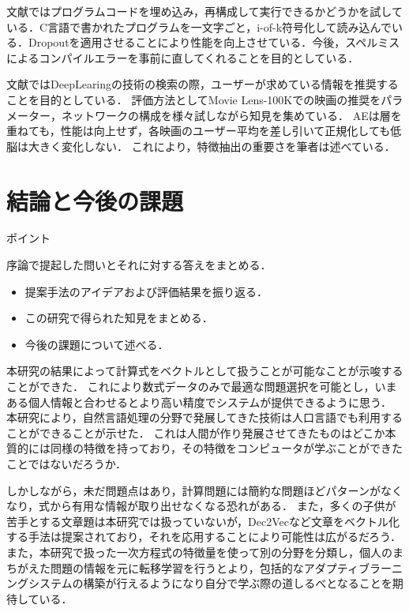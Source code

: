 \documentclass[a4j,11pt,report]{jsbook}
\newcommand{\point}[1]{
\begin{itembox}[l]{ポイント}
  #1
\end{itembox}
}
\begin{document}
文献\cite{lannrenn4}ではプログラムコードを埋め込み，再構成して実行できるかどうかを試している．C言語で書かれたプログラムを一文字ごと，i-of-k符号化して読み込んでいる．Dropoutを適用させることにより性能を向上させている．今後，スペルミスによるコンパイルエラーを事前に直してくれることを目的としている．

文献\cite{kannrenn5}ではDeepLearingの技術の検索の際，ユーザーが求めている情報を推奨することを目的としている．
評価方法としてMovie Lens-100Kでの映画の推奨をパラメーター，ネットワークの構成を様々試しながら知見を集めている．
AEは層を重ねても，性能は向上せず，各映画のユーザー平均を差し引いて正規化しても低脳は大きく変化しない．
これにより，特徴抽出の重要さを筆者は述べている．





\chapter{結論と今後の課題 \label{ch:conclusion}}
\point{
序論で提起した問いとそれに対する答えをまとめる．
\begin{itemize}
  \item 提案手法のアイデアおよび評価結果を振り返る．
  \item この研究で得られた知見をまとめる．
  \item 今後の課題について述べる．
\end{itemize}
}
\fi

本研究の結果によって計算式をベクトルとして扱うことが可能なことが示唆することができた．
これにより数式データのみで最適な問題選択を可能とし，いまある個人情報と合わせるとより高い精度でシステムが提供できるように思う．
本研究により，自然言語処理の分野で発展してきた技術は人口言語でも利用することができることが示せた．
これは人間が作り発展させてきたものはどこか本質的には同様の特徴を持っており，その特徴をコンピュータが学ぶことができたことではないだろうか．

しかしながら，未だ問題点はあり，計算問題には簡約な問題ほどパターンがなくなり，式から有用な情報が取り出せなくなる恐れがある．
また，多くの子供が苦手とする文章題は本研究では扱っていないが，Dec2Vecなど文章をベクトル化する手法は提案されており，それを応用することにより可能性は広がるだろう．
また，本研究で扱った一次方程式の特徴量を使って別の分野を分類し，個人のまちがえた問題の情報を元に転移学習を行うとより，包括的なアダプティブラーニングシステムの構築が行えるようになり自分で学ぶ際の道しるべとなることを期待している．
\end{document}
